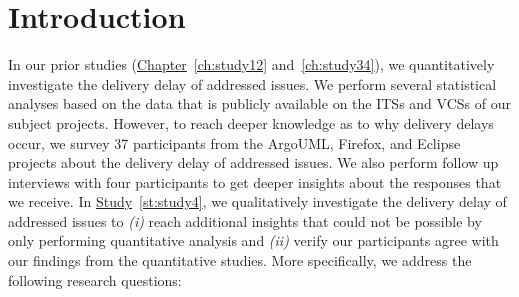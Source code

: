 \section{Introduction} \label{ch6:introduction}

In our prior studies (\hyperref[ch:study12]{Chapter}~\ref{ch:study12}
and~\ref{ch:study34}), we quantitatively investigate the delivery delay of
addressed issues. We perform several statistical analyses based on the data that
is publicly available on the ITSs and VCSs of our subject projects. However, to
reach deeper knowledge as to why delivery delays occur, we survey 37
participants from the ArgoUML, Firefox, and Eclipse projects about the delivery
delay of addressed issues. We also perform follow up interviews with four
participants to get deeper insights about the responses that we receive.  In
\hyperref[st:study4]{Study}~\ref{st:study4}, we qualitatively \DIFaddbegin {}\DIFaddend investigate the delivery delay of addressed issues to {\em (i)} reach additional
insights that could not be possible by only performing quantitative analysis and
{\em (ii)} verify \DIFdelbegin {}\DIFdelend \DIFaddbegin {}\DIFaddend our participants agree with our findings from the
quantitative studies. More specifically, we address the following research
questions:

